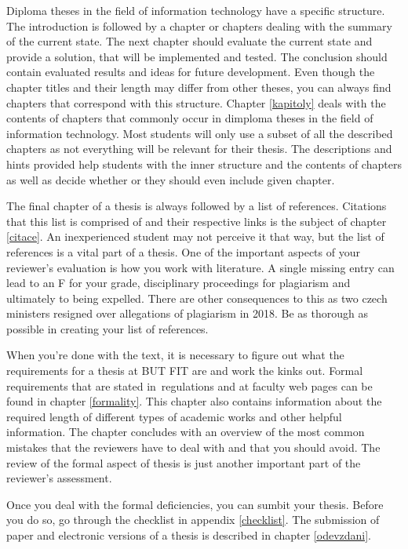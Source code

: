 Diploma theses in the field of information technology have a specific  structure. The introduction is followed by a chapter or chapters dealing with the summary of the current state. The next chapter should evaluate the current state and provide a solution, that will be implemented and tested. The conclusion should contain evaluated results and ideas for future development. Even though the chapter titles and their length may differ from other theses, you can always find chapters that correspond with this structure. Chapter \ref{kapitoly} deals with the contents of chapters that commonly occur in dimploma theses in the field of information technology. Most students will only use a subset of all the described chapters as not everything will be relevant for their thesis. The descriptions and hints provided help students with the inner structure and the contents of chapters as well as decide whether or they should even include given chapter.

The final chapter of a thesis is always followed by a list of references. Citations that this list is comprised of and their respective links is the subject of chapter \ref{citace}. An inexperienced student may not perceive it that way, but the list of references is a vital part of a thesis. One of the important aspects of your reviewer's evaluation is how you work with literature. A single missing entry can lead to an F for your grade, disciplinary proceedings for plagiarism and ultimately to being expelled. There are other consequences to this as two czech ministers resigned over allegations of plagiarism in 2018. Be as thorough as possible in creating your list of references.

When you're done with the text, it is necessary to figure out what the requirements for a thesis at BUT FIT are and work the kinks out. Formal requirements that are stated in~regulations and at faculty web pages can be found in chapter \ref{formality}. This chapter also contains information about the required length of different types of academic works and other helpful information. The chapter concludes with an overview of the most common mistakes that the reviewers have to deal with and that you should avoid. The review of the formal aspect of thesis is just another important part of the reviewer's assessment.

Once you deal with the formal deficiencies, you can sumbit your thesis. Before you do so, go through the checklist in appendix \ref{checklist}. The submission of paper and electronic versions of a thesis is described in chapter \ref{odevzdani}.


